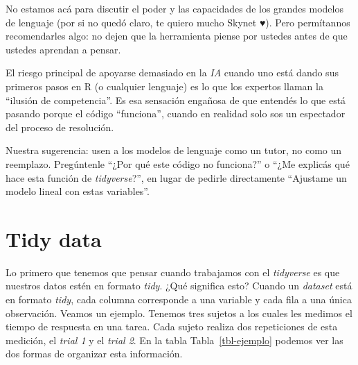 \documentclass[
  letterpaper,
  DIV=11,
  numbers=noendperiod,
  oneside]{scrreprt}
\begin{document}
\begin{tcolorbox}[enhanced jigsaw, breakable, rightrule=.15mm, colbacktitle=quarto-callout-warning-color!10!white, bottomtitle=1mm, arc=.35mm, titlerule=0mm, left=2mm, toprule=.15mm, leftrule=.75mm, colback=white, opacitybacktitle=0.6, opacityback=0, colframe=quarto-callout-warning-color-frame, bottomrule=.15mm, coltitle=black, toptitle=1mm, title={Unas palabras sobre el uso de modelos de lenguaje (ChatGPT, Claude,
Gemini o el que les guste)}]
No estamos acá para discutir el poder y las capacidades de los grandes
modelos de lenguaje (por si no quedó claro, te quiero mucho Skynet ♥️).
Pero permítannos recomendarles algo: no dejen que la herramienta piense
por ustedes antes de que ustedes aprendan a pensar.

El riesgo principal de apoyarse demasiado en la \emph{IA} cuando uno
está dando sus primeros pasos en R (o cualquier lenguaje) es lo que los
expertos llaman la ``ilusión de competencia''. Es esa sensación engañosa
de que entendés lo que está pasando porque el código ``funciona'',
cuando en realidad solo sos un espectador del proceso de resolución.

Nuestra sugerencia: usen a los modelos de lenguaje como un tutor, no
como un reemplazo. Pregúntenle ``¿Por qué este código no funciona?'' o
``¿Me explicás qué hace esta función de \emph{tidyverse}?'', en lugar de
pedirle directamente ``Ajustame un modelo lineal con estas variables''.
\end{tcolorbox}

\hypertarget{tidy-data}{%
\section{Tidy data}\label{tidy-data}}

Lo primero que tenemos que pensar cuando trabajamos con el
\emph{tidyverse} es que nuestros datos estén en formato \emph{tidy}.
¿Qué significa esto? Cuando un \emph{dataset} está en formato
\emph{tidy}, cada columna corresponde a una variable y cada fila a una
única observación. Veamos un ejemplo. Tenemos
tres sujetos a los cuales les medimos el tiempo de respuesta en una
tarea. Cada sujeto realiza dos repeticiones de esta medición, el
\emph{trial 1} y el \emph{trial 2}. En la tabla Tabla~\ref{tbl-ejemplo}
podemos ver las dos formas de organizar esta información.
\end{document}

